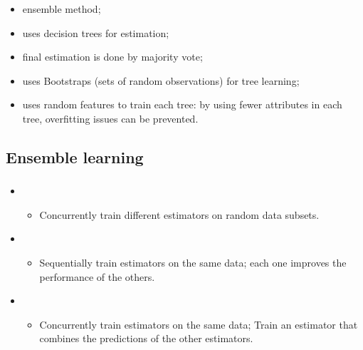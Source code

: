 \documentclass[xcolor=table]{beamer}
\begin{document}
\begin{frame}
	\frametitle{\insertsection}
	
	\begin{itemize}
		\item ensemble method;
		\item uses decision trees for estimation;
		\item final estimation is done by majority vote;
		\item uses Bootstraps (sets of random observations) for tree learning;
		\item uses random features to train each tree: by using fewer attributes in each tree, overfitting issues can be prevented.
	\end{itemize}
	
\end{frame}

\subsection{Ensemble learning}

\begin{frame}
	\frametitle{\insertsection}
	\framesubtitle{\insertsubsection}
	
	\begin{itemize}
		\item {}
		\begin{itemize}
			\item Concurrently train different estimators on random data subsets.
		\end{itemize}
		\item {}
		\begin{itemize}
			\item Sequentially train estimators on the same data; each one improves the performance of the others.
		\end{itemize}
		\item {}
		\begin{itemize}
			\item Concurrently train estimators on the same data; Train an estimator that combines the predictions of the other estimators.
		\end{itemize}
	\end{itemize}
	
\end{frame}
\end{document}
